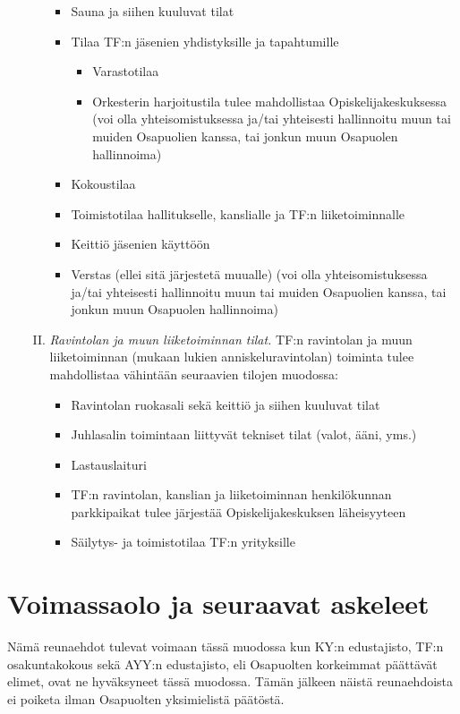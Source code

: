 \documentclass[a4paper, 12pt, finnish]{report}
\begin{document}
\begin{enumerate}
\begin{enumerate}[I.]
\begin{itemize}
                    \item{Sauna ja siihen kuuluvat tilat}
                    \item{Tilaa TF:n jäsenien yhdistyksille ja tapahtumille}
                        \begin{itemize}
                            \item{Varastotilaa}
                            \item{Orkesterin harjoitustila tulee mahdollistaa Opiskelijakeskuksessa (voi olla yhteisomistuksessa ja/tai yhteisesti hallinnoitu muun tai muiden Osapuolien kanssa, tai jonkun muun Osapuolen hallinnoima)}
                        \end{itemize}
                    \item{Kokoustilaa}
                    \item{Toimistotilaa hallitukselle, kanslialle ja TF:n liiketoiminnalle}
                    \item{Keittiö jäsenien käyttöön}
                    \item{Verstas (ellei sitä järjestetä muualle) (voi olla yhteisomistuksessa ja/tai yhteisesti hallinnoitu muun tai muiden Osapuolien kanssa, tai jonkun muun Osapuolen hallinnoima)}
                \end{itemize}
            \item{\textit{Ravintolan ja muun liiketoiminnan tilat.} TF:n ravintolan ja muun liiketoiminnan (mukaan lukien anniskeluravintolan) toiminta tulee mahdollistaa vähintään seuraavien tilojen muodossa:}
                \begin{itemize}
                    \item{Ravintolan ruokasali sekä keittiö ja siihen kuuluvat tilat}
                    \item{Juhlasalin toimintaan liittyvät tekniset tilat (valot, ääni, yms.)}
                    \item{Lastauslaituri}
                    \item{TF:n ravintolan, kanslian ja liiketoiminnan henkilökunnan parkkipaikat tulee järjestää Opiskelijakeskuksen läheisyyteen}
                    \item{Säilytys- ja toimistotilaa TF:n yrityksille}
                \end{itemize}
        \end{enumerate}
\end{enumerate}


\newpage
\section*{Voimassaolo ja seuraavat askeleet}
Nämä reunaehdot tulevat voimaan tässä muodossa kun KY:n edustajisto, TF:n osakuntakokous sekä AYY:n edustajisto, eli Osapuolten korkeimmat päättävät elimet, ovat ne hyväksyneet tässä muodossa.
Tämän jälkeen näistä reunaehdoista ei poiketa ilman Osapuolten yksimielistä päätöstä.\\
\end{document}
